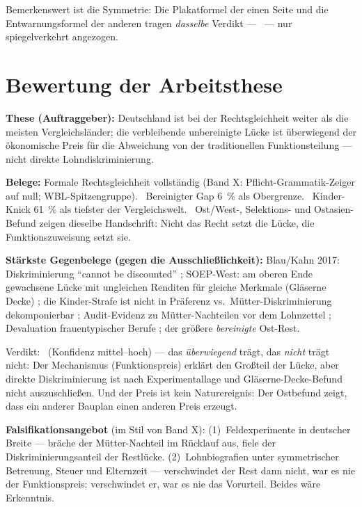 Bemerkenswert ist die Symmetrie: Die Plakatformel der einen Seite und die
Entwarnungsformel der anderen tragen \emph{dasselbe} Verdikt --- \virref\ ---
nur spiegelverkehrt angezogen.

\section{Bewertung der Arbeitsthese}

\textbf{These (Auftraggeber):} Deutschland ist bei der Rechtsgleichheit weiter
als die meisten Vergleichsl\"ander; die verbleibende unbereinigte L\"ucke ist
\"uberwiegend der \"okonomische Preis f\"ur die Abweichung von der traditionellen
Funktionsteilung --- nicht direkte Lohndiskriminierung.

\textbf{Belege:} Formale Rechtsgleichheit vollst\"andig (Band X:
Pflicht-Grammatik-Zeiger auf null; WBL-Spitzengruppe). \plausibel\ Bereinigter
Gap 6~\% als Obergrenze. \belegt\ Kinder-Knick 61~\% als tiefster der
Vergleichswelt. \belegt\ Ost/West-, Selektions- und Ostasien-Befund zeigen
dieselbe Handschrift: Nicht das Recht setzt die L\"ucke, die Funktionszuweisung
setzt sie. \plausibel

\textbf{St\"arkste Gegenbelege (gegen die Ausschlie\ss lichkeit):} Blau/Kahn 2017:
Diskriminierung \enquote{cannot be discounted} \belegt; SOEP-West: am oberen Ende
gewachsene L\"ucke mit ungleichen Renditen f\"ur gleiche Merkmale (Gl\"aserne
Decke) \belegt; die Kinder-Strafe ist nicht in Pr\"aferenz vs.\
M\"utter-Diskriminierung dekomponierbar \belegt; Audit-Evidenz zu
M\"utter-Nachteilen vor dem Lohnzettel \plausibel; Devaluation frauentypischer
Berufe \umstritten; der gr\"o\ss ere \emph{bereinigte} Ost-Rest.

\begin{merksatz}
Verdikt: \vteil\ (Konfidenz mittel--hoch) --- das \emph{\"uberwiegend} tr\"agt,
das \emph{nicht} tr\"agt nicht: Der Mechanismus (Funktionspreis) erkl\"art den
Gro\ss teil der L\"ucke, aber direkte Diskriminierung ist nach Experimentallage
und Gl\"aserne-Decke-Befund nicht auszuschlie\ss en. Und der Preis ist kein
Naturereignis: Der Ostbefund zeigt, dass ein anderer Bauplan einen anderen
Preis erzeugt.
\end{merksatz}

\textbf{Falsifikationsangebot} (im Stil von Band X): (1)~Feldexperimente in
deutscher Breite --- br\"ache der M\"utter-Nachteil im R\"ucklauf aus, fiele der
Diskriminierungsanteil der Restl\"ucke. (2)~Lohnbiografien unter symmetrischer
Betreuung, Steuer und Elternzeit --- verschwindet der Rest dann nicht, war es
nie der Funktionspreis; verschwindet er, war es nie das Vorurteil. Beides
w\"are Erkenntnis.

